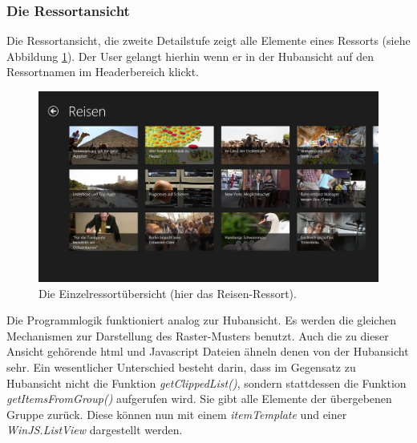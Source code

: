 \documentclass[12pt,a4paper,bibtotoc,abstracton]{scrartcl}
\begin{document}
\begin{minipage}{\linewidth}
  
\end{minipage}

\subsubsection{Die Ressortansicht}
\label{subsubsec:ressortansicht}
Die Ressortansicht, die zweite Detailstufe zeigt alle Elemente eines Ressorts (siehe Abbildung \ref{fig:einzelressortübersicht}). Der User gelangt hierhin wenn er in der Hubansicht auf den Ressortnamen im Headerbereich klickt. 

\begin{figure}[h]
	\centering
	\includegraphics[width=\textwidth]{Bilder/Screenshots/app/reise_aegypten_3gdmit.png} 
	\caption[Die Einzelressortübersicht]{Die Einzelressortübersicht (hier das Reisen-Ressort).}
	\label{fig:einzelressortübersicht}
\end{figure}

Die Programmlogik funktioniert analog zur Hubansicht. Es werden die gleichen Mechanismen zur Darstellung des Raster-Musters benutzt. Auch die zu dieser Ansicht gehörende \ac{html} und Javascript Dateien ähneln denen von der Hubansicht sehr. Ein wesentlicher Unterschied besteht darin, dass im Gegensatz zu Hubansicht nicht die Funktion \textit{getClippedList()}, sondern stattdessen die Funktion \textit{getItemsFromGroup()} aufgerufen wird. Sie gibt alle Elemente der übergebenen Gruppe zurück. Diese können nun mit einem \textit{itemTemplate} und einer \textit{WinJS.ListView} dargestellt werden. 
\end{document}
